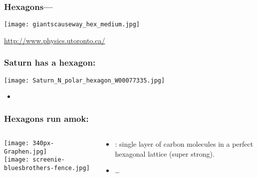 \begin{frame}

  \frametitle{Hexagons---}

  \texttt{[image: giantscauseway\_hex\_medium.jpg]}

  {\tiny \url{http://www.physics.utoronto.ca/}}


\end{frame}

\begin{frame}
  \frametitle{Saturn has a hexagon:}

  \begin{center}
    \texttt{[image: Saturn\_N\_polar\_hexagon\_W00077335.jpg]}
  \end{center}

  \begin{itemize}
  \item 
  \end{itemize}

\end{frame}

\begin{frame}

  \frametitle{Hexagons run amok:}

  \begin{columns}
    \texttt{[image: 340px-Graphen.jpg]}\\
    \bigskip
    \texttt{[image: screenie-bluesbrothers-fence.jpg]}
    \begin{block}{}
      \begin{itemize}
      \item 
        :
        single layer of carbon molecules
        in a perfect hexagonal lattice (super strong).
      \item 
         \ldots
      \end{itemize}
    \end{block}
  \end{columns}

\end{frame}

